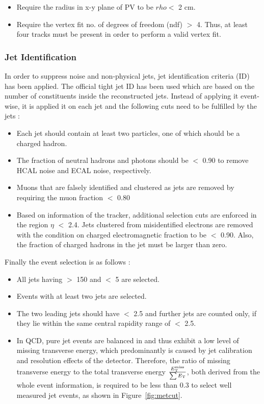 \begin{itemize}
\item Require the radius in x-y plane of PV to be $rho <$ 2 cm.
\item Require the vertex fit no. of degrees of freedom (ndf) $>$ 4. Thus, at least four tracks must be present in order to perform a valid 
  vertex fit.
\end{itemize}

\subsubsection{Jet Identification}
In order to suppress noise and non-physical jets, jet identification criteria (ID) has been applied. The official tight jet ID has been used which are based on the number of constituents inside the reconstructed jets. Instead of applying it event-wise, it 
is applied it on each jet and the following cuts need to be fulfilled by the jets :

\begin{itemize}
\item Each jet should contain at least two particles, one of which should be a charged hadron.
\item The fraction of neutral hadrons and photons should be $<$ 0.90 to remove HCAL noise and ECAL
  noise, respectively. 
\item Muons that are falsely identified and clustered as jets are removed by requiring the muon fraction $<$ 0.80 
\item Based on information of the tracker, additional selection cuts are enforced in the region $\eta$ $<$ 2.4. Jets clustered from 
  misidentified electrons are removed with the condition on charged electromagnetic fraction to be $<$ 0.90. Also, the fraction of charged 
  hadrons in the jet must be larger than zero. 
\end{itemize}

Finally the event selection is as follows : 

\begin{itemize}
\item All jets having \pt $>$ 150 \GeV and  $<$ 5 are selected.
\item Events with at least two jets are selected.
\item The two leading jets should have  $<$ 2.5 and further jets are counted only, if they lie within the same central rapidity range of  $<$ 2.5.
\item In QCD, pure jet events are balanced in \pt and thus exhibit a low level of missing transverse energy, which predominantly is caused 
  by jet calibration and resolution effects of the detector. Therefore, the ratio of missing transverse energy to the total transverse energy
  $\frac{\ETmiss}{\sum \ET}$, both derived from the whole event information, is required to be less than 0.3 to select well measured
  jet events, as shown in Figure~\ref{fig:metcut}. 
\end{itemize}

